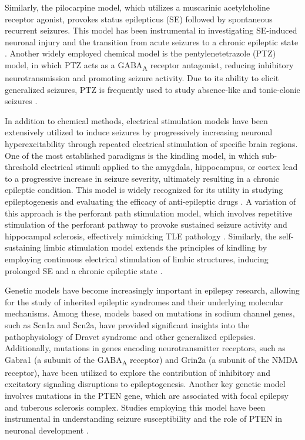 \documentclass{article}
\begin{document}
Similarly, the pilocarpine model, which utilizes a muscarinic acetylcholine receptor agonist, provokes status epilepticus (SE) followed by spontaneous recurrent seizures. This model has been instrumental in investigating SE-induced neuronal injury and the transition from acute seizures to a chronic epileptic state \cite{reddy2013}. Another widely employed chemical model is the pentylenetetrazole (PTZ) model, in which PTZ acts as a GABA\textsubscript{A} receptor antagonist, reducing inhibitory neurotransmission and promoting seizure activity. Due to its ability to elicit generalized seizures, PTZ is frequently used to study absence-like and tonic-clonic seizures \cite{rubio2024}.

In addition to chemical methods, electrical stimulation models have been extensively utilized to induce seizures by progressively increasing neuronal hyperexcitability through repeated electrical stimulation of specific brain regions. One of the most established paradigms is the kindling model, in which sub-threshold electrical stimuli applied to the amygdala, hippocampus, or cortex lead to a progressive increase in seizure severity, ultimately resulting in a chronic epileptic condition. This model is widely recognized for its utility in studying epileptogenesis and evaluating the efficacy of anti-epileptic drugs \cite{reddy2024}. A variation of this approach is the perforant path stimulation model, which involves repetitive stimulation of the perforant pathway to provoke sustained seizure activity and hippocampal sclerosis, effectively mimicking TLE pathology \cite{reddy2013}. Similarly, the self-sustaining limbic stimulation model extends the principles of kindling by employing continuous electrical stimulation of limbic structures, inducing prolonged SE and a chronic epileptic state \cite{reddy2013}.

Genetic models have become increasingly important in epilepsy research, allowing for the study of inherited epileptic syndromes and their underlying molecular mechanisms. Among these, models based on mutations in sodium channel genes, such as Scn1a and Scn2a, have provided significant insights into the pathophysiology of Dravet syndrome and other generalized epilepsies\cite{rubio2024}. Additionally, mutations in genes encoding neurotransmitter receptors, such as Gabra1 (a subunit of the GABA\textsubscript{A} receptor) and Grin2a (a subunit of the NMDA receptor), have been utilized to explore the contribution of inhibitory and excitatory signaling disruptions to epileptogenesis. Another key genetic model involves mutations in the PTEN gene, which are associated with focal epilepsy and tuberous sclerosis complex. Studies employing this model have been instrumental in understanding seizure susceptibility and the role of PTEN in neuronal development \cite{rubio2024}.
\end{document}
